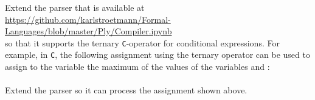 \exerciseEng
Extend the parser that is available at
\\[0.2cm]
\hspace*{1.3cm}
\href{
 https://github.com/karlstroetmann/Formal-Languages/blob/master/Ply/Compiler.ipynb}{https://github.com/karlstroetmann/Formal-Languages/blob/master/Ply/Compiler.ipynb} 
\\[0.2cm]
so that it supports the ternary \texttt{C}-operator for conditional expressions.  For example, in \texttt{C},
the following assignment using the ternary operator can be used to assign to the variable 
the maximum of the values of the variables  and :
\\[0.2cm]
\hspace*{1.3cm}
\\[0.2cm]
Extend the parser so it can process the assignment shown above. \eox 

